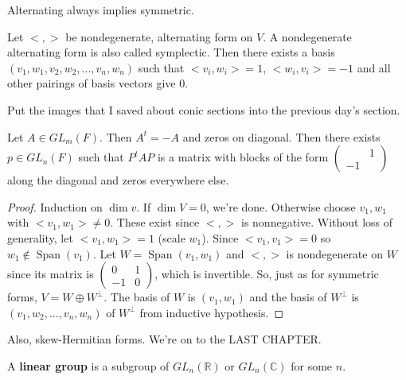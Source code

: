 \documentclass{article}
\newcommand{\vocab}[1]{\textbf{\color{blue!90}\boldmath #1}}
\newcommand{\C}{\mathbb{C}}
\newcommand{\R}{\mathbb{R}}
\DeclareMathOperator{\Span}{Span}
\begin{document}
Alternating always implies symmetric.
\begin{theorem}
Let $<,>$ be nondegenerate, alternating form on $V$. A nondegenerate alternating form is also called symplectic. Then there exists a basis $(v_1,w_1,v_2,w_2,...,v_n,w_n)$ such that $<v_i,w_i>=1$, $<w_i,v_i>=-1$ and all other pairings of basis vectors give 0.
\end{theorem}
\begin{remark}
Put the images that I saved about conic sections into the previous day's section.
\end{remark}
\begin{theorem}
Let $A\in GL_m(F)$. Then $A^t=-A$ and zeros on diagonal. Then there exists $p\in GL_n(F)$ such that $P^tAP$ is a matrix with blocks of the form $\begin{pmatrix}&1\\-1&\end{pmatrix}$ along the diagonal and zeros everywhere else.
\end{theorem}
\begin{proof}
Induction on $\dim v$. If $\dim V=0$, we're done. Otherwise choose $v_1,w_1$ with $<v_1,w_1>\neq 0$. These exist since $<,>$ is nonnegative. Without loss of generality, let $<v_1,w_1>=1$ (scale $w_1$). Since $<v_1,v_1>=0$ so $w_1\notin \Span(v_1)$. Let $W=\Span(v_1,w_1)$ and $<,>$ is nondegenerate on $W$ since its matrix is $\begin{pmatrix}0&1\\-1&0\end{pmatrix}$, which is invertible. So, just as for symmetric forms, $V=W\oplus W^\perp$. The basis of $W$ is $(v_1,w_1)$ and the basis of $W^\perp$ is $(v_1,w_2,...,v_n,w_n)
$ of $W^\perp$ from inductive hypothesis.
\end{proof}
Also, skew-Hermitian forms. We're on to the LAST CHAPTER.
\begin{definition}
A \vocab{linear group} is a subgroup of $GL_n(\R)$ or $GL_n(\C)$ for some $n$.
\end{definition}
\end{document}
